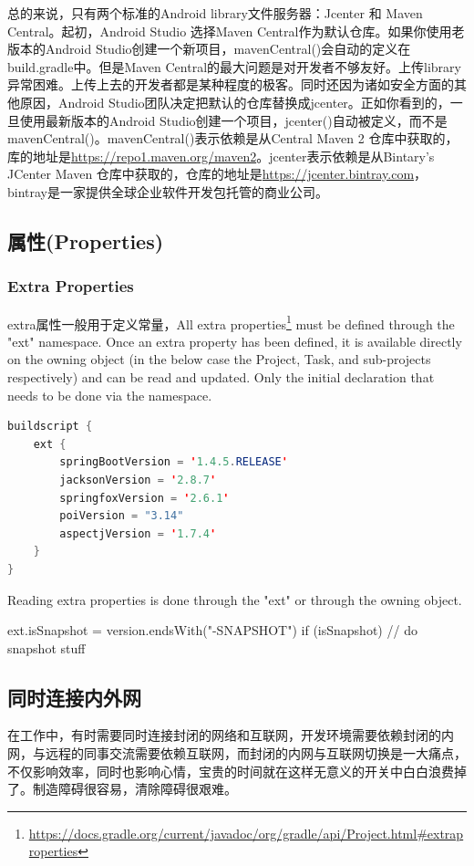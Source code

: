 \documentclass[letter]{book}
\begin{document}
总的来说，只有两个标准的Android library文件服务器：Jcenter 和 Maven Central。起初，Android Studio 选择Maven Central作为默认仓库。如果你使用老版本的Android Studio创建一个新项目，mavenCentral()会自动的定义在build.gradle中。但是Maven Central的最大问题是对开发者不够友好。上传library异常困难。上传上去的开发者都是某种程度的极客。同时还因为诸如安全方面的其他原因，Android Studio团队决定把默认的仓库替换成jcenter。正如你看到的，一旦使用最新版本的Android Studio创建一个项目，jcenter()自动被定义，而不是mavenCentral()。mavenCentral()表示依赖是从Central Maven 2 仓库中获取的，库的地址是\url{https://repo1.maven.org/maven2}。jcenter表示依赖是从Bintary’s JCenter Maven 仓库中获取的，仓库的地址是\url{https://jcenter.bintray.com}，bintray是一家提供全球企业软件开发包托管的商业公司。

\subsection{属性(Properties)}

\subsubsection{Extra Properties}

extra属性一般用于定义常量，All extra properties\footnote{\url{https://docs.gradle.org/current/javadoc/org/gradle/api/Project.html\#extraproperties}} must be defined through the "ext" namespace. Once an extra property has been defined, it is available directly on the owning object (in the below case the Project, Task, and sub-projects respectively) and can be read and updated. Only the initial declaration that needs to be done via the namespace.

\begin{lstlisting}[language=Java]
buildscript {
	ext {
		springBootVersion = '1.4.5.RELEASE'
		jacksonVersion = '2.8.7'
		springfoxVersion = '2.6.1'
		poiVersion = "3.14"
		aspectjVersion = '1.7.4'
	}
}
\end{lstlisting}

Reading extra properties is done through the "ext" or through the owning object.


ext.isSnapshot = version.endsWith("-SNAPSHOT")
if (isSnapshot) {
	// do snapshot stuff
}

\subsection{同时连接内外网}

在工作中，有时需要同时连接封闭的网络和互联网，开发环境需要依赖封闭的内网，与远程的同事交流需要依赖互联网，而封闭的内网与互联网切换是一大痛点，不仅影响效率，同时也影响心情，宝贵的时间就在这样无意义的开关中白白浪费掉了。制造障碍很容易，清除障碍很艰难。
\end{document}
